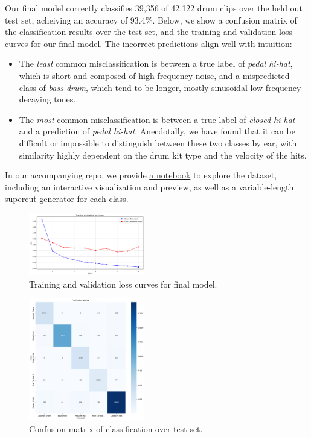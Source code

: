 \documentclass[twocolumn]{article}
\begin{document}
Our final model correctly classifies 39,356 of 42,122 drum clips over the held out test set, acheiving an accuracy of 93.4\%.
Below, we show a confusion matrix of the classification results over the test set, and the training and validation loss curves for our final model.
The incorrect predictions align well with intuition:
\begin{itemize}
\item The \textit{least} common misclassification is between a true label of \textit{pedal hi-hat}, which is short and composed of high-frequency noise, and a mispredicted class of \textit{bass drum}, which tend to be longer, mostly sinusoidal low-frequency decaying tones.
\item The \textit{most} common misclassification is between a true label of \textit{closed hi-hat} and a prediction of \textit{pedal hi-hat}.
      Anecdotally, we have found that it can be difficult or impossible to distinguish between these two classes by ear, with similarity highly dependent on the drum kit type and the velocity of the hits.
\end{itemize}

In our accompanying repo, we provide \href{https://github.com/khiner/DrumClassification/blob/main/explore_dataset.ipynb}{a notebook} to explore the dataset, including an interactive visualization and preview, as well as a variable-length supercut generator for each class.
\begin{figure}
\centering
\includegraphics[width=0.45\textwidth]{figures/final_model_loss.png}
\caption{Training and validation loss curves for final model.}
\label{fig:final_model_loss}
\end{figure}

\begin{figure}
\centering
\includegraphics[width=0.45\textwidth]{figures/confusion_matrix.png}
\caption{Confusion matrix of classification over test set.}
\label{fig:confusion_matrix}
\end{figure}
\end{document}
